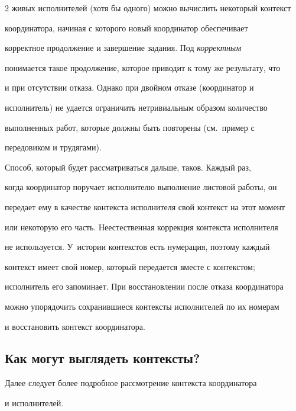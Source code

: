 \begin{multicols}{2}
живых исполнителей (хотя бы одного) можно вычислить некоторый контекст 


координатора, начиная с которого новый координатор обеспечивает 


корректное продолжение и завершение задания. Под \textit{корректным} 


понимается такое продолжение, которое приводит к тому же результату, что 


и при отсутствии отказа. Однако при двойном отказе (координатор и 


исполнитель) не удается ограничить нетривиальным образом количество 


выполненных работ, которые должны быть повторены (см.\ пример с 


передовиком и трудягами). 


      


      Способ, который будет рассматриваться дальше, таков. Каждый раз, 


когда координатор поручает исполнителю выполнение листовой работы, он 


передает ему в качестве контекста исполнителя свой контекст на этот момент 


или некоторую его часть. Неестественная коррекция контекста исполнителя 


не используется. У~истории контекстов есть нумерация, поэтому каж\-дый 


контекст имеет свой номер, который передается вместе с контекстом; 


исполнитель его запоминает. При восстановлении после отказа координатора 


можно упорядочить сохранившиеся контексты исполнителей по их номерам 


и восстановить контекст координатора. 





\subsection{Как могут выглядеть контексты?}


      


      Далее следует более подробное рассмотрение контекста координатора 


и исполнителей.






\end{multicols}
